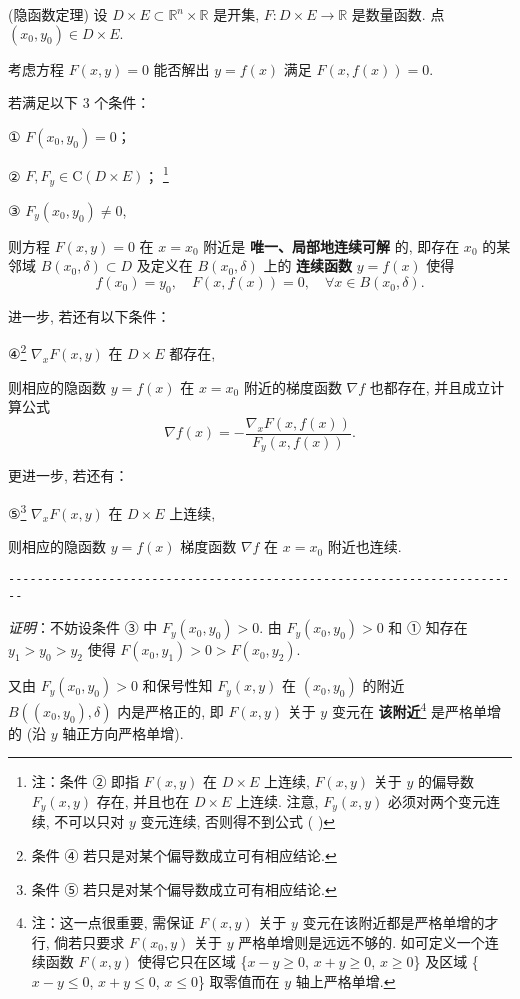  \begin{theorem}{(隐函数定理)}
 设 $D\times E\subset\mathbb{R}^{n}\times\mathbb{R}$ 是开集, $F:D\times E\rightarrow\mathbb{R}$
是数量函数. 点 $(x_{0},y_{0})\in D\times E.$ 

考虑方程 $F(x,y)=0$ 能否解出 $y=f(x)$ 满足 $F(x,f(x))=0.$ 

若满足以下 3 个条件：

① $F(x_{0},y_{0})=0$；

② $F,F_{y}\in\mathrm{C}(D\times E)$； \footnote{注：条件 ② 即指 $F(x,y)$ 在 $D\times E$ 上连续, $F(x,y)$ 关于 $y$ 的偏导数 $F_{y}(x,y)$
存在, 并且也在 $D\times E$ 上连续. 注意, $F_{y}(x,y)$ 必须对两个变元连续, 不可以只对 $y$
变元连续, 否则得不到公式 ( )} 

③ $F_{y}(x_{0},y_{0})\neq0$, 

则方程 $F(x,y)=0$ 在 $x=x_{0}$ 附近是\textbf{ 唯一、局部地连续可解} 的, 即存在 $x_{0}$
的某邻域 $B(x_{0},\delta)\subset D$ 及定义在 $B(x_{0},\delta)$ 上的\textbf{
连续函数} $y=f(x)$ 使得
\[
f(x_{0})=y_{0},\quad F(x,f(x))=0,\quad\forall x\in B(x_{0},\delta).
\]

进一步, 若还有以下条件：

④\footnote{条件 ④ 若只是对某个偏导数成立可有相应结论. } $\nabla_{x}F(x,y)$ 在 $D\times E$
都存在, 

则相应的隐函数 $y=f(x)$ 在 $x=x_{0}$ 附近的梯度函数 $\nabla f$ 也都存在, 并且成立计算公式
\[
\nabla f(x)=-{\displaystyle \frac{\nabla_{x}F(x,f(x))}{F_{y}(x,f(x))}.}
\]

更进一步, 若还有：

⑤\footnote{条件 ⑤ 若只是对某个偏导数成立可有相应结论. } $\nabla_{x}F(x,y)$ 在 $D\times E$
上连续, 

则相应的隐函数 $y=f(x)$ 梯度函数 $\nabla f$ 在 $x=x_{0}$ 附近也连续.

\verb|------------------------------------------------------------------------|

\textsl{证明}：不妨设条件 ③ 中 $F_{y}(x_{0},y_{0})>0.$ 由 $F_{y}(x_{0},y_{0})>0$ 和
① 知存在 $y_{1}>y_{0}>y_{2}$ 使得 $F(x_{0},y_{1})>0>F(x_{0},y_{2})$. 

又由 $F_{y}(x_{0},y_{0})>0$ 和保号性知 $F_{y}(x,y)$ 在 $(x_{0},y_{0})$
的附近 $B((x_{0},y_{0}),\delta)$ 内是严格正的, 即 $F(x,y)$ 关于 $y$ 变元在 \textbf{该附近}\footnote{注：这一点很重要, 需保证 $F(x,y)$ 关于 $y$ 变元在该附近都是严格单增的才行, 倘若只要求 $F(x_{0},y)$
关于 $y$ 严格单增则是远远不够的. 如可定义一个连续函数 $F(x,y)$ 使得它只在区域 \{$x-y\geqslant0$,
$x+y\geqslant0$, $x\geqslant0$\} 及区域 \{$x-y\leqslant0$, $x+y\leqslant0$,
$x\leqslant0$\} 取零值而在 $y$ 轴上严格单增. } 是严格单增的 (沿 $y$ 轴正方向严格单增). 


\end{theorem}
